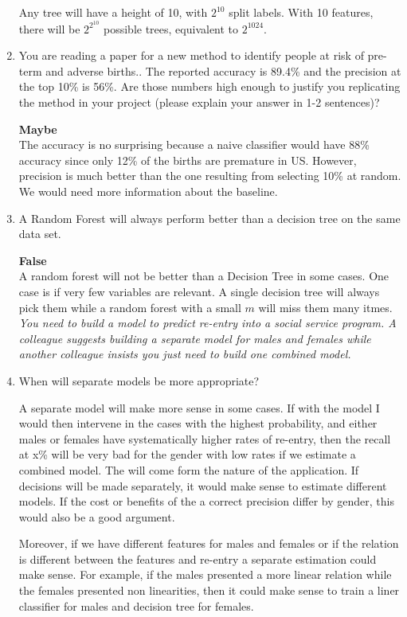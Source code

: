 \documentclass[a4paper, 11pt]{article}
\begin{document}
\begin{enumerate}
Any tree will have a height of 10, with $2^10$ split labels. With 10 features, there will be $2^{2^{10}}$ possible trees, equivalent to $2^{1024}$.

\item You are reading a paper for a new method to identify people at risk of pre-term and adverse births.. The reported accuracy is 89.4\% and the precision at the top 10\% is 56\%. Are those numbers high enough to justify you replicating the method in your project (please explain your answer in 1-2 sentences)?

\textbf{Maybe}\\
The accuracy is no surprising because a naive classifier would have 88\% accuracy since only 12\% of the births are premature in US. However, precision is much better than the one resulting from selecting 10\% at random. We would need more information about the baseline.

\item A Random Forest will always perform better than a decision tree on the same data set.

\textbf{False}\\
A random forest will not be better than a Decision Tree in some cases. One case is if very few variables are relevant. A single decision tree will always pick them while a random forest with a small $m$ will miss them many itmes.
\\

\textit{You need to build a model to predict re-entry into a social service program. A colleague suggests building a separate model for males and females while another colleague insists you just need to build one combined model.}
\item When will separate models be more appropriate?

A separate model will make more sense in some cases. If with the model I would then intervene in the cases with the highest probability, and either males or females have systematically higher rates of re-entry, then the recall at x\% will be very bad for the gender with low rates if we estimate a combined model. The will come form the nature of the application. If decisions will be made separately, it would make sense to estimate different models. If the cost or benefits of the a correct precision differ by gender, this would also be a good argument.

Moreover, if we have different features for males and females or if the relation is different between the features and re-entry a separate estimation could make sense. For example, if the males presented a more linear relation while the females presented non linearities, then it could make sense to train a liner classifier for males and decision tree for females. 


\end{enumerate}
\end{document}
